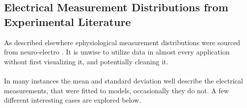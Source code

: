 \subsection{Electrical Measurement Distributions from Experimental Literature}\label{section:nelectro}

As described elsewhere ephysiological measurement distributions were sourced from neuro-electro \cite{tripathy2014neuroelectro}. It is unwise to utilize data in almost every application without first visualizing it, and potentially cleaning it.\\
\\
In many instances the mean and standard deviation well describe the electrical measurements, that were fitted to models, occasionally they do not. A few different interesting cases are explored below.

